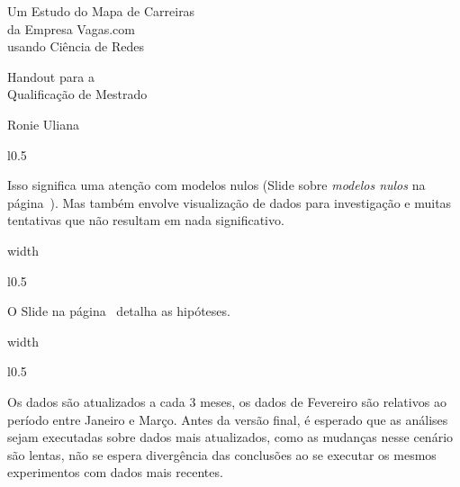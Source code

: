 \documentclass[10pt,a4paper,final]{article}
\newcommand\disappearingrule{%
  \par %
  \vskip10pt %
  \leaders\vrule width \textwidth\vskip0.4pt %
  \nointerlineskip %
  \vskip10pt %
}
\begin{document}
\pagestyle{empty}
\begin{center}
  \vspace*{\fill}
  
  {\Huge Um Estudo do Mapa de Carreiras \\
    da Empresa Vagas.com \\
    usando Ciência de Redes}
  
  \vspace{3\baselineskip}
  
  {\Large Handout para a \\
    Qualificação de Mestrado}
  
  \vspace{3\baselineskip}
    
  Ronie Uliana
  
  \vspace{\fill}
\end{center}

\newpage

\small

\begin{minipage}[t][18\baselineskip]{\linewidth}
  \begin{wrapfigure}{l}{0.5\textwidth}
  \end{wrapfigure}
  
  Isso significa uma atenção com modelos nulos (Slide sobre \textit{modelos nulos} na página~\pageref{sde:modelos-nulos}). Mas também envolve visualização de dados para investigação e muitas tentativas que não resultam em nada significativo.
\end{minipage}

\disappearingrule

\begin{minipage}[t][18\baselineskip]{\linewidth}
  \begin{wrapfigure}{l}{0.5\textwidth}
  \end{wrapfigure}

  O Slide na página~\pageref{sde:hipoteses} detalha as hipóteses.
\end{minipage}

\disappearingrule

\begin{minipage}[t][18\baselineskip]{\linewidth}
  \begin{wrapfigure}{l}{0.5\textwidth}
  \end{wrapfigure}

  Os dados são atualizados a cada 3 meses, os dados de Fevereiro são relativos ao período entre Janeiro e Março. Antes da versão final, é esperado que as análises sejam executadas sobre dados mais atualizados, como as mudanças nesse cenário são lentas, não se espera divergência das conclusões ao se executar os mesmos experimentos com dados mais recentes.
\end{minipage}
\end{document}
